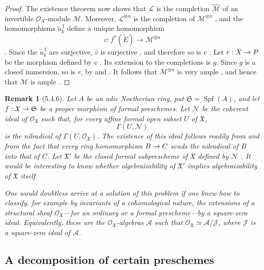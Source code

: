 \documentclass[oneside]{amsart}
\theoremstyle{ega-env-style}
\theoremstyle{ega-thm-env-style}
\theoremstyle{ega-defn-env-style}
\newtheorem*{remark}{Remark}
\def\mathcal{\mathscr}
\def\sh{\mathcal}                   %
\def\Spf{\operatorname{Spf}}
\renewcommand{\to}{\mathchoice{\longrightarrow}{\rightarrow}{\rightarrow}{\rightarrow}}
\newcommand{\oldpage}[2][]{{\marginnote{\normalfont{\textbf{#1}~|~#2}}}\ignorespaces}
\let\EGAOriginalLabel\label
\renewcommand{\label}[1]{\phantomsection\EGAOriginalLabel{#1}}
\begin{document}
\begin{proof}
The existence theorem  now shows that $\sh{L}$ is
the completion $\widehat{\sh{M}}$ of an invertible
$\sh{O}_X$-module $\sh{M}$.  Moreover,
$\sh{L}^{\otimes n}$ is the completion of
$\sh{M}^{\otimes n}$ , and the homomorphisms
$\widetilde{u}_k^{\,\sharp}$ define a unique homomorphism
\[
  v:f^*(\widetilde{E})
  \longrightarrow
  \sh{M}^{\otimes n}
\]
.  Since the
$\widetilde{u}_k^{\,\sharp}$ are surjective,
$\widehat{v}$ is surjective , and therefore so
is $v$ .  Let $r:X\to P$ be the morphism defined
by $v$ .  Its extension to the completions is
$g$.  Since $g$ is a closed immersion, so is $r$, by
 and .  It follows that
$\sh{M}^{\otimes n}$ is very ample , and hence
that $\sh{M}$ is ample .
\end{proof}

\begin{remark}[5.4.6]
\label{III.5.4.6}
Let $A$ be an adic Noetherian ring, put
$\mathfrak{S}=\Spf(A)$, and let
$f:\mathfrak{X}\to\mathfrak{S}$ be a proper morphism of formal
preschemes.  Let $\sh{N}$ be the coherent ideal of
$\sh{O}_{\mathfrak{X}}$ such that, for every affine formal open
subset $U$ of $\mathfrak{X}$,
\[
  \Gamma(U,\sh{N})
\]
is the nilradical of
$\Gamma(U,\sh{O}_{\mathfrak{X}})$.  The existence of this ideal
follows readily from  and from the fact that
every ring homomorphism $B\to C$ sends the nilradical of $B$ into
that of $C$.  Let $\mathfrak{X}'$ be the closed formal
subprescheme of $\mathfrak{X}$ defined by $\sh{N}$
.  It would be interesting to know whether
algebraizability of $\mathfrak{X}'$ implies algebraizability of
$\mathfrak{X}$ itself.

One would doubtless arrive at a solution of this problem if one
knew how to classify, for example by invariants
\oldpage[III]{159}
of a cohomological nature, the \emph{extensions} of a structural
sheaf $\sh{O}_{\mathfrak{X}}$---for an ordinary or a formal
prescheme---by a square-zero ideal.  Equivalently, these are the
$\sh{O}_{\mathfrak{X}}$-algebras $\sh{A}$ such that
$\sh{O}_{\mathfrak{X}}\simeq\sh{A}/\sh{J}$, where $\sh{J}$ is a
square-zero ideal of $\sh{A}$.
\end{remark}


\subsection{A decomposition of certain preschemes}
\label{subsection:III.5.5}
\end{document}
